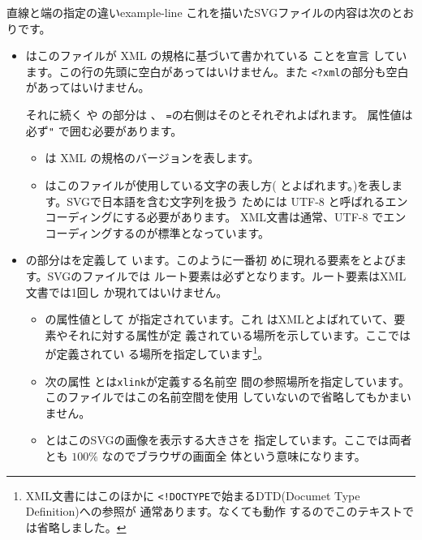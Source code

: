      {直線と端の指定の違い}{example-line}
     これを描いたSVGファイルの内容は次のとおりです。
{}
\begin{itemize}
 \item {}はこのファイルが XML の規格に基づいて書かれている
       ことを宣言
       しています。この行の先頭に空白があってはいけません。また
       \texttt{<?xml}の部分も空白があってはいけません。

       それに続く や  の部分は
       、
       \texttt{=}の右側はそのとそれぞれよばれます。
       属性値は必ず\texttt{"}%
       で囲む必要があります。
\begin{itemize}
 \item {}は XML の規格のバージョンを表します。
 \item {}はこのファイルが使用している文字の表し方(
とよばれます。)を表します。SVGで日本語を含む文字列を扱う
       ためには UTF-8 と呼ばれるエンコーディングにする必要があります。
       XML文書は通常、UTF-8 でエンコーディングするのが標準となっています。
\end{itemize}
 \item {}の部分はを定義して
       います。このように一番初
       めに現れる要素をとよびます。SVGのファイルでは
       ルート要素は必ずとなります。ルート要素はXML文書では1回し
       か現れてはいけません。
\begin{itemize}
 \item {}の属性値として  が指定されています。これ
       はXMLとよばれていて、要素やそれに対する属性が定
       義されている場所を示しています。ここでは が定義されてい
       る場所を指定しています\footnote{XML文書にはこのほかに
       \texttt{<!DOCTYPE}で始まるDTD(Documet Type Definition)への参照が
       通常あります。なくても動作
       するのでこのテキストでは省略しました。}。
 \item 次の属性 とは\texttt{xlink}が定義する名前空
       間の参照場所を指定しています。このファイルではこの名前空間を使用
       していないので省略してもかまいません。
 \item {}とはこのSVGの画像を表示する大きさを
       指定しています。ここでは両者とも $100\%$ なのでブラウザの画面全
       体という意味になります。
\end{itemize}

\end{itemize}
